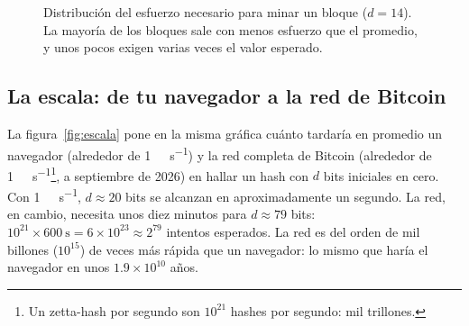 \documentclass[11pt,a4paper]{article}
\newcommand{\webhint}[1]{}
\newcommand{\fuentedatos}[1]{\par\smallskip{\footnotesize\textit{Datos:}~\texttt{\detokenize{#1}}}}
\begin{document}
\begin{figure}[tbp]
\centering
\webhint{figure; id=fig-minado-histograma; chart=histogram+line; data=data/mining_hist.csv; x=izq; y=densidad_empirica(barras),densidad_teorica; curve=exp(-x); interactive=el lector mina una serie de bloques y compara el histograma con la curva; alt=Histograma de los intentos necesarios para minar 600 bloques, en múltiplos del valor esperado, que decrece como la curva exponencial e a la menos x.}
\caption{Distribución del esfuerzo necesario para minar un bloque ($d=14$). La mayoría de los bloques sale con menos esfuerzo que el promedio, y unos pocos exigen varias veces el valor esperado.}\label{fig:minado}
\fuentedatos{data/mining_hist.csv}
\end{figure}

\subsection{La escala: de tu navegador a la red de Bitcoin}

La figura~\ref{fig:escala} pone en la misma gráfica cuánto tardaría en promedio un navegador (alrededor de \SI{1}{\mega\hash\per\second}) y la red completa de Bitcoin (alrededor de \SI{1}{\zetta\hash\per\second}\footnote{Un zetta-hash por segundo son $10^{21}$ hashes por segundo: mil trillones.}, a septiembre de 2026) en hallar un hash con $d$ bits iniciales en cero. Con \SI{1}{\mega\hash\per\second}, $d\approx 20$ bits se alcanzan en aproximadamente un segundo. La red, en cambio, necesita unos diez minutos para $d\approx 79$ bits: $10^{21}\times 600\ \text{s}=6\times10^{23}\approx 2^{79}$ intentos esperados. La red es del orden de mil billones ($10^{15}$) de veces más rápida que un navegador: lo mismo que haría el navegador en unos $1.9\times 10^{10}$ años.
\end{document}
